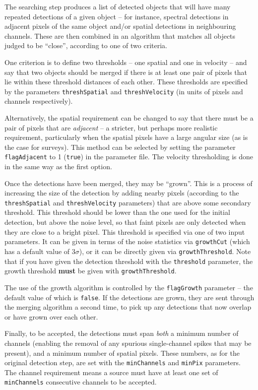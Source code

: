 \label{sec-merger}

The searching step produces a list of detected objects that will have
many repeated detections of a given object -- for instance, spectral
detections in adjacent pixels of the same object and/or spatial
detections in neighbouring channels. These are then combined in an
algorithm that matches all objects judged to be ``close'', according
to one of two criteria.

One criterion is to define two thresholds -- one spatial and one in
velocity -- and say that two objects should be merged if there is at
least one pair of pixels that lie within these threshold distances of
each other. These thresholds are specified by the parameters
\texttt{threshSpatial} and \texttt{threshVelocity} (in units of pixels
and channels respectively).

Alternatively, the spatial requirement can be changed to say that
there must be a pair of pixels that are \emph{adjacent} -- a stricter,
but perhaps more realistic requirement, particularly when the spatial
pixels have a large angular size (as is the case for 
\hi surveys). This 
method can be selected by setting the parameter
\texttt{flagAdjacent} to 1 (\ie \texttt{true}) in the parameter
file. The velocity thresholding is done in the same way as the first
option.

Once the detections have been merged, they may be ``grown''. This is a
process of increasing the size of the detection by adding nearby
pixels (according to the \texttt{threshSpatial} and
\texttt{threshVelocity} parameters) that are above some secondary
threshold. This threshold should be lower than the one used for the
initial detection, but above the noise level, so that faint pixels are
only detected when they are close to a bright pixel. This
threshold is specified via one of two input parameters. It can be
given in terms of the noise statistics via \texttt{growthCut} (which
has a default value of $3\sigma$), or it can be directly given via
\texttt{growthThreshold}. Note that if you have given the detection
threshold with the \texttt{threshold} parameter, the growth threshold
\textbf{must} be given with \texttt{growthThreshold}.

The use of the growth algorithm is controlled by the
\texttt{flagGrowth} parameter -- the default value of which is
\texttt{false}. If the detections are grown, they are sent through the
merging algorithm a second time, to pick up any detections that now
overlap or have grown over each other.

Finally, to be accepted, the detections must span \emph{both} a
minimum number of channels (enabling the removal of any spurious
single-channel spikes that may be present), and a minimum number of
spatial pixels. These numbers, as for the original detection step, are
set with the \texttt{minChannels} and \texttt{minPix} parameters. The
channel requirement means a source must have at least one set of
\texttt{minChannels} consecutive channels to be
accepted.
